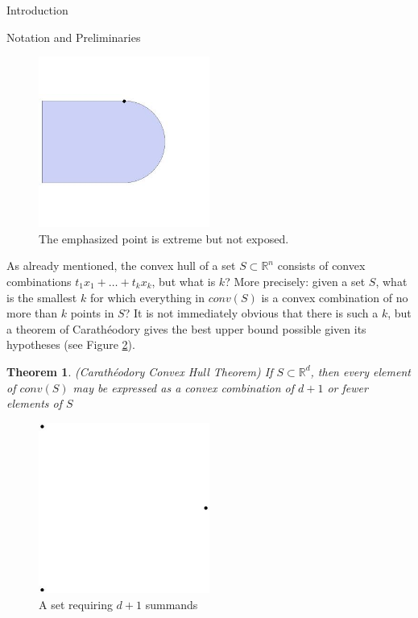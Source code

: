 \documentclass[12pt,oneside,final]{ucthesisucsbmath2010}
\newcommand{\R}{\mathbb{R}}
\newtheorem{thm}{Theorem}[section]
\theoremstyle{definition}
\begin{document}
\begin{chapter}{Introduction}
\begin{section}{Notation and Preliminaries}
\begin{figure}[H]
  \begin{center}
    \includegraphics[width=0.5\textwidth]{nonexposed}
    \caption{The emphasized point is extreme but not exposed.}
    \label{nonexposed}
  \end{center}
\end{figure}

As already mentioned, the convex hull of a set $S \subset \R^n$ consists of convex combinations $t_1x_1+\ldots+t_kx_k$, but what is $k$? More precisely: given a set $S$, what is the smallest $k$ for which everything in $conv(S)$ is a convex combination of no more than $k$ points in $S$? It is not immediately obvious that there is such a $k$, but a theorem of Carath\'{e}odory gives the best upper bound possible given its hypotheses (see Figure \ref{Caratheodory}).

\begin{thm}(Carath\'{e}odory Convex Hull Theorem) If $S \subset \R^d$, then every element of $conv(S)$ may be expressed as a convex combination of $d+1$ or fewer elements of $S$
\label{Cara}
\end{thm}

\begin{figure}[H]
  
  \begin{center}
    \includegraphics[width=0.5\textwidth]{Caratheodory}
    \caption{A set requiring $d+1$ summands}
    \label{Caratheodory}
  \end{center}
\end{figure}


\end{section}
\end{chapter}
\end{document}
